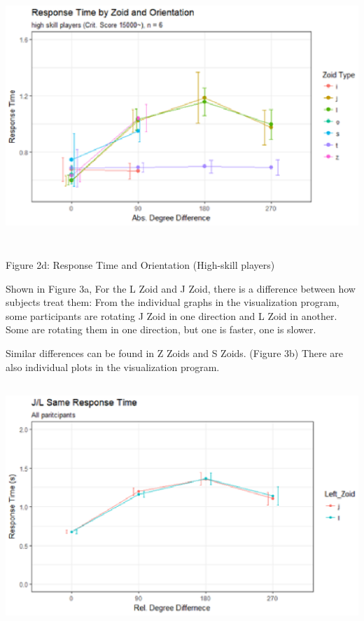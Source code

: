 \documentclass{article}
\begin{document}
	\noindent \includegraphics*[width=6.27in, height=3.87in, keepaspectratio=false]{image18}
	
	\noindent Figure 2d: Response Time and Orientation (High-skill players)
	
	\noindent Shown in Figure 3a, For the L Zoid and J Zoid, there is a difference between how subjects treat them: From the individual graphs in the visualization program, some participants are rotating J Zoid in one direction and L Zoid in another. Some are rotating them in one direction, but one is faster, one is slower. 
	
	\noindent Similar differences can be found in Z Zoids and S Zoids. (Figure 3b) There are also individual plots in the visualization program. \includegraphics*[width=6.34in, height=3.91in, keepaspectratio=false]{image19} 
	
\end{document}
